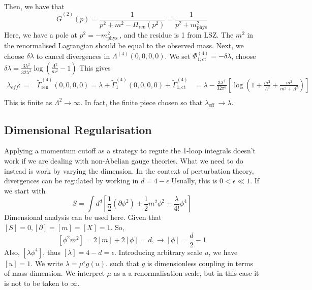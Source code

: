 \documentclass[11pt, oneside]{article}   	%
\theoremstyle{slanted}
\begin{document}
Then, we have that 
\[
\tilde{ G } ^ \left( 2  \right)  \left( p  \right)   = 
\frac{1}{p ^ 2 + m ^ 2  - \Pi _{\text{ren} } \left( p ^ 2  \right)   } 
 = \frac{1}{p ^ 2 + m ^ 2 _{\text{phys} } } 
\] Here, we have a pole at $ p ^ 2  =   - m ^ 2 _{\text{phys } } $, 
and the residue is 1 from LSZ. 
The $ m ^ 2 $ in the renormalised Lagrangian 
should be equal to the observed mass. 
Next, we choose 
$ \delta \lambda $ to cancel divergences in $ \Lambda ^{ \left( 4  \right)   } 
\left( 0 , 0 , 0, 0  \right)  $. 
We set $ \Phi _{ 1, \text{ct } } ^{ \left( 4  \right)  }  = - \delta \lambda $, 
choose $ \delta \lambda  = \frac{3 \lambda ^ 2 }{ 32 \lambda ^ 2 } \log \left( 
\frac{\Lambda ^ 2 }{ m ^ 2 } - 1 \right) $  
This gives 
\begin{align*}
\lambda _{ eff} : =& \tilde{ \Gamma } ^{ \left( 4  \right)  } _{\text{ren} } 
\left(  0 , 0 , 0 , 0  \right)   = \lambda + \tilde{ \Gamma } _ 1 ^{ \left( 4  \right)  } 
\left( 0 , 0 , 0 , 0  \right)  + \tilde{ \Gamma } _{ 1, \text{ct } } ^{ \left( 4  \right)  } 
&=  \lambda - \frac{3 \lambda ^ 2 }{ 32 \pi ^ 2 } \left[  
\log \left( 1 + \frac{m^ 2 }{ \Lambda ^ 2 } + \frac{m ^ 2 }{ 
m ^ 2 + \Lambda ^ 2 }  \right)  \right]  \\
\end{align*} This is finite as $ \Lambda ^ 2 \to \infty  $. 
In fact, the finite piece chosen so that $ \lambda_{\text{eff }} \to \lambda $. 

\subsection{Dimensional Regularisation}
Applying a momentum cutoff as a 
strategy to regute the 
1-loop integrals doesn't work if 
we are dealing with non-Abelian gauge theories. 
What we need to do instead is 
work by varying the dimension. 
In the context of perturbation theory, 
divergences can be regulated by working in $ d  = 4 - \epsilon $ 
Usually, this is $ 0 < \epsilon \ll 1$. 
If we start with 
\[
S  = \int d ^ d  \left[  \frac{1}{2 } \left( 
\partial  \phi ^ 2  \right)  + \frac{1}{2 } m ^ 2 \phi ^ 2  + \frac{\lambda }{ 4 ! }
\phi ^ 4 \right] 
\]  Dimensional analysis can be used here. Given that 
$ \left[ S  \right]   =0,\left[  \partial   \right]  = \left[  
m \right]  = \left[  X  \right]   = 1    $. 
So, 
\[
\left[  \phi ^2 m ^ 2  \right]   = 2 \left[  m  \right]  + 2 \left[  \phi  \right]  
= d , \to \left[  \phi  \right]   = \frac{d}{2 } - 1
\] Also, $ \left[  \lambda \phi ^ 4  \right]   $, 
thus $ \left[  \lambda  \right]  = 4 - d  = \epsilon $.
Introducing arbitrary scale $ u $, we 
have $ \left[  u  \right]   = 1 $. 
We write $ \lambda  = \mu ^{ \epsilon  } g \left( u  \right)   $. 
such that $ g $ is dimensionless coupling 
in terms of mass dimension. 
We interpret $ \mu $ as a 
a renormalisation scale, but in this 
case it is not to be taken 
to $ \infty $. 
\end{document}
